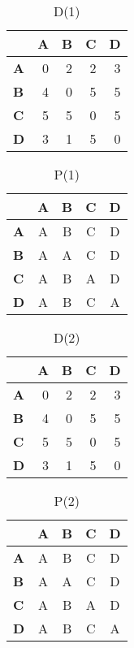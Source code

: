 \documentclass{article}
\begin{document}
\begin{table}[H]\centering
\caption{D(1)}
\begin{tabular}{l r r r r}
\toprule
 & \textbf{A} & \textbf{B} & \textbf{C} & \textbf{D}\\\midrule
\textbf{A} & 0 & 2 & 2 & 3 \\
\textbf{B} & 4 & 0 & 5 & 5 \\
\textbf{C} & 5 & 5 & 0 & 5 \\
\textbf{D} & 3 & 1 & \cellcolor{yellow!30}5 & 0 \\
\bottomrule
\end{tabular}
\end{table}

\begin{table}[H]\centering
\caption{P(1)}
\begin{tabular}{l c c c c}
\toprule
 & \textbf{A} & \textbf{B} & \textbf{C} & \textbf{D}\\\midrule
\textbf{A} & \cellcolor{yellow!30}A & B & C & D \\
\textbf{B} & A & \cellcolor{yellow!30}A & C & D \\
\textbf{C} & A & B & \cellcolor{yellow!30}A & D \\
\textbf{D} & A & B & C & \cellcolor{yellow!30}A \\
\bottomrule
\end{tabular}
\end{table}

\begin{table}[H]\centering
\caption{D(2)}
\begin{tabular}{l r r r r}
\toprule
 & \textbf{A} & \textbf{B} & \textbf{C} & \textbf{D}\\\midrule
\textbf{A} & 0 & 2 & 2 & 3 \\
\textbf{B} & 4 & 0 & 5 & 5 \\
\textbf{C} & 5 & 5 & 0 & 5 \\
\textbf{D} & 3 & 1 & 5 & 0 \\
\bottomrule
\end{tabular}
\end{table}

\begin{table}[H]\centering
\caption{P(2)}
\begin{tabular}{l c c c c}
\toprule
 & \textbf{A} & \textbf{B} & \textbf{C} & \textbf{D}\\\midrule
\textbf{A} & A & B & C & D \\
\textbf{B} & A & A & C & D \\
\textbf{C} & A & B & A & D \\
\textbf{D} & A & B & C & A \\
\bottomrule
\end{tabular}
\end{table}
\end{document}
